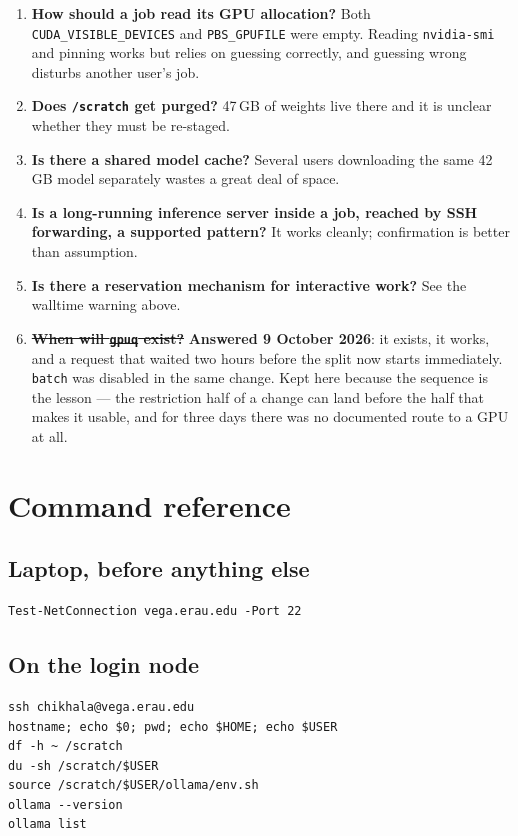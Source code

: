 \documentclass[11pt,a4paper]{article}
\begin{document}
\begin{enumerate}
  \item \textbf{How should a job read its GPU allocation?} Both
        \texttt{CUDA\_VISIBLE\_DEVICES} and \texttt{PBS\_GPUFILE} were empty.
        Reading \texttt{nvidia-smi} and pinning works but relies on guessing
        correctly, and guessing wrong disturbs another user's job.
  \item \textbf{Does \texttt{/scratch} get purged?} 47\,GB of weights live
        there and it is unclear whether they must be re-staged.
  \item \textbf{Is there a shared model cache?} Several users downloading the
        same 42\,GB model separately wastes a great deal of space.
  \item \textbf{Is a long-running inference server inside a job, reached by SSH
        forwarding, a supported pattern?} It works cleanly; confirmation is
        better than assumption.
  \item \textbf{Is there a reservation mechanism for interactive work?} See the
        walltime warning above.
  \item \textbf{\sout{When will \texttt{gpuq} exist?}} \textbf{Answered
        9 October 2026}: it exists, it works, and a request that waited two
        hours before the split now starts immediately. \texttt{batch} was
        disabled in the same change. Kept here because the sequence is the
        lesson --- the restriction half of a change can land before the half
        that makes it usable, and for three days there was no documented route
        to a GPU at all.
\end{enumerate}

\appendix
\section{Command reference}

\subsection{Laptop, before anything else}
\begin{lstlisting}
Test-NetConnection vega.erau.edu -Port 22
\end{lstlisting}

\subsection{On the login node}
\begin{lstlisting}
ssh chikhala@vega.erau.edu
hostname; echo $0; pwd; echo $HOME; echo $USER
df -h ~ /scratch
du -sh /scratch/$USER
source /scratch/$USER/ollama/env.sh
ollama --version
ollama list
\end{lstlisting}
\end{document}
